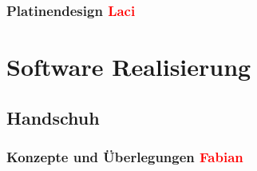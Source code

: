 \documentclass[titlepage,12pt,twoside]{article}
\begin{document}
\subsubsection{Platinendesign \textcolor{red}{Laci}}


\section{Software Realisierung}

\subsection{Handschuh}
\subsubsection{Konzepte und Überlegungen \textcolor{red}{Fabian}}
\end{document}
